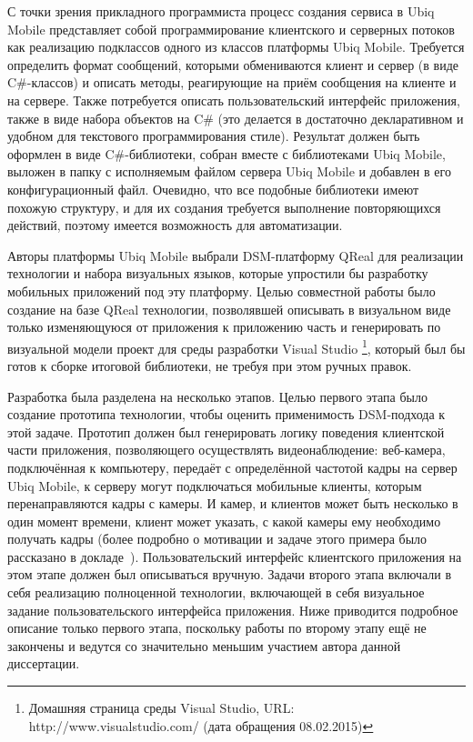 С точки зрения прикладного программиста процесс создания сервиса в Ubiq Mobile представляет 
собой программирование клиентского и серверных потоков как реализацию подклассов одного 
из классов платформы Ubiq Mobile. Требуется определить формат сообщений, которыми 
обмениваются клиент и сервер (в виде C\#-классов) и описать методы, реагирующие на 
приём сообщения на клиенте и на сервере. Также потребуется описать пользовательский 
интерфейс приложения, также в виде набора объектов на C\# (это делается в достаточно 
декларативном и удобном для текстового программирования стиле). Результат должен быть 
оформлен в виде C\#-библиотеки, собран вместе с библиотеками Ubiq Mobile, выложен в 
папку с исполняемым файлом сервера Ubiq Mobile и добавлен в его конфигурационный файл. 
Очевидно, что все подобные библиотеки имеют похожую структуру, и для их создания требуется 
выполнение повторяющихся действий, поэтому имеется возможность для автоматизации.

Авторы платформы Ubiq Mobile выбрали \ac{DSM}-платформу QReal для реализации технологии 
и набора визуальных языков, которые упростили бы разработку мобильных приложений под 
эту платформу. Целью совместной работы было создание на базе QReal технологии, позволявшей 
описывать в визуальном виде только изменяющуюся от приложения к приложению часть и 
генерировать по визуальной модели проект для среды разработки Visual Studio%
\footnote{Домашняя страница среды Visual Studio, URL: http://www.visualstudio.com/ (дата обращения 08.02.2015)}, 
который был бы готов к сборке итоговой библиотеки, не требуя при этом ручных правок. 

Разработка была разделена на несколько этапов. Целью первого этапа было создание прототипа 
технологии, чтобы оценить применимость \ac{DSM}-подхода к этой задаче. Прототип должен 
был генерировать логику поведения клиентской части приложения, позволяющего осуществлять 
видеонаблюдение: веб-камера, подключённая к компьютеру, передаёт с определённой частотой 
кадры на сервер Ubiq Mobile, к серверу могут подключаться мобильные клиенты, которым 
перенаправляются кадры с камеры. И камер, и клиентов может быть несколько в один момент 
времени, клиент может указать, с какой камеры ему необходимо получать кадры 
(более подробно о мотивации и задаче этого примера было рассказано в докладе~\cite{terekhov2011ubiq}).
Пользовательский интерфейс клиентского приложения на этом этапе должен был описываться 
вручную. Задачи второго этапа включали в себя реализацию полноценной технологии, включающей 
в себя визуальное задание пользовательского интерфейса приложения. Ниже приводится 
подробное описание только первого этапа, поскольку работы по второму этапу ещё не 
закончены и ведутся со значительно меньшим участием автора данной диссертации.

